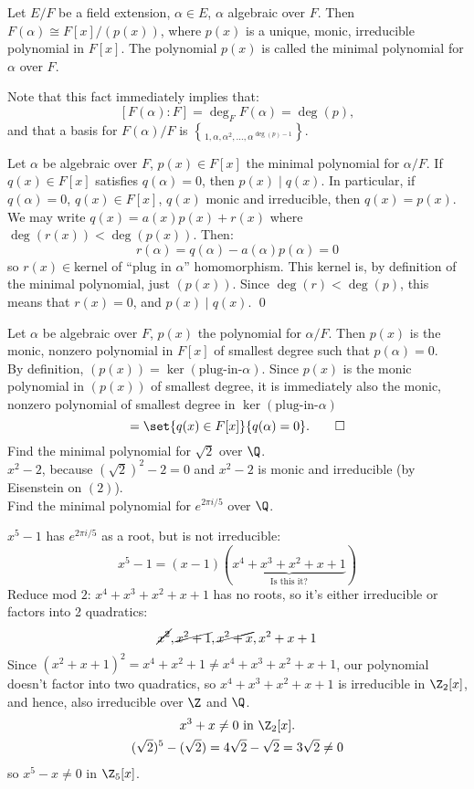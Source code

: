 Let $E/F$ be a field extension, $\alpha\in E$, $\alpha$ algebraic over $F$.  Then $F(\alpha)\cong F[x]/(p(x))$, where $p(x)$ is a unique, monic, irreducible polynomial in $F[x]$.  The polynomial $p(x)$ is called the minimal polynomial for $\alpha$ over $F$.

Note that this fact immediately implies that:
\[ [F(\alpha):F] = \deg_F F(\alpha) = \deg(p) , \]
and that a basis for $F(\alpha)/F$ is $\brace{1,\alpha,\alpha^2,\dotsc,\alpha^{\deg(p)-1}}$.

\thm Let $\alpha$ be algebraic over $F$, $p(x)\in F[x]$ the minimal polynomial for $\alpha/F$.  If $q(x)\in F[x]$ satisfies $q(\alpha)=0$, then $p(x)\mid q(x)$.  In particular, if $q(\alpha)=0$, $q(x)\in F[x]$, $q(x)$ monic and irreducible, then $q(x)=p(x)$. \\
\pf We may write $q(x)=a(x)p(x)+r(x)$ where $\deg(r(x))<\deg(p(x))$.  Then:
\[ r(\alpha) = q(\alpha)-a(\alpha)p(\alpha) = 0 \]
so $r(x)\in{}$kernel of ``plug in $\alpha$'' homomorphism.  This kernel is, by definition of the minimal polynomial, just $(p(x))$.  Since $\deg(r)<\deg(p)$, this means that $r(x)=0$, and $p(x)\mid q(x)$. \qed

\thm Let $\alpha$ be algebraic over $F$, $p(x)$ the polynomial for $\alpha/F$.  Then $p(x)$ is the monic, nonzero polynomial in $F[x]$ of smallest degree such that $p(\alpha)=0$. \\
\pf By definition, $(p(x))=\ker(\text{plug-in-$\alpha$})$.  Since $p(x)$ is the monic polynomial in $(p(x))$ of smallest degree, it is immediately also the monic, nonzero polynomial of smallest degree in $\ker(\text{plug-in-$\alpha$})$
\[ = \set{q(x)\in F[x]}{q(\alpha)=0} . \qed \]
\eg Find the minimal polynomial for $\sqrt2$ over $\Q$. \\
\ans $x^2-2$, because $(\sqrt2)^2-2=0$ and $x^2-2$ is monic and irreducible (by Eisenstein on $(2)$). \\
\eg Find the minimal polynomial for $e^{2\pi i/5}$ over $\Q$.

$x^5-1$ has $e^{2\pi i/5}$ as a root, but is not irreducible:
\[ x^5-1 = (x-1)(\underbrace{x^4+x^3+x^2+x+1}_{\text{Is this it?}}) \]
Reduce mod $2$: $x^4+x^3+x^2+x+1$ has no roots, so it's either irreducible or factors into 2 quadratics:
\[ \cancel{x^2}, \cancel{x^2+1}, \cancel{x^2+x}, x^2+x+1 \]
Since $(x^2+x+1)^2=x^4+x^2+1\neq x^4+x^3+x^2+x+1$, our polynomial doesn't factor into two quadratics, so $x^4+x^3+x^2+x+1$ is irreducible in $\Z_2[x]$, and hence, also irreducible over $\Z$ and $\Q$.
\begin{gather*}
x^3 + x \neq 0 \text{ in } \Z_2[x] . \\
(\sqrt2)^5 - (\sqrt2) = 4\sqrt2 - \sqrt2 = 3\sqrt2 \neq 0
\end{gather*}
so $x^5-x\neq0$ in $\Z_5[x]$.

